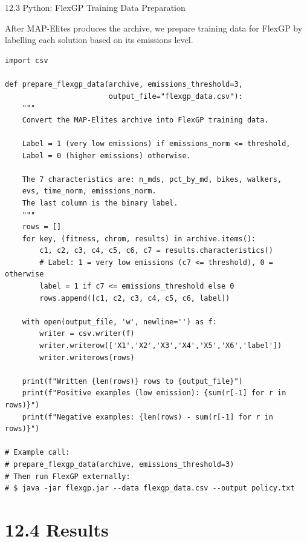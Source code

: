 \documentclass[aspectratio=169,10pt]{beamer}
\begin{document}
\begin{frame}[fragile]{12.3 Python: FlexGP Training Data Preparation}

After MAP-Elites produces the archive, we prepare training data
for FlexGP by labelling each solution based on its emissions level.

\begin{lstlisting}[caption={Prepare FlexGP training data from MAP-Elites archive}]
import csv

def prepare_flexgp_data(archive, emissions_threshold=3,
                        output_file="flexgp_data.csv"):
    """
    Convert the MAP-Elites archive into FlexGP training data.

    Label = 1 (very low emissions) if emissions_norm <= threshold,
    Label = 0 (higher emissions) otherwise.

    The 7 characteristics are: n_mds, pct_by_md, bikes, walkers,
    evs, time_norm, emissions_norm.
    The last column is the binary label.
    """
    rows = []
    for key, (fitness, chrom, results) in archive.items():
        c1, c2, c3, c4, c5, c6, c7 = results.characteristics()
        # Label: 1 = very low emissions (c7 <= threshold), 0 = otherwise
        label = 1 if c7 <= emissions_threshold else 0
        rows.append([c1, c2, c3, c4, c5, c6, label])

    with open(output_file, 'w', newline='') as f:
        writer = csv.writer(f)
        writer.writerow(['X1','X2','X3','X4','X5','X6','label'])
        writer.writerows(rows)

    print(f"Written {len(rows)} rows to {output_file}")
    print(f"Positive examples (low emission): {sum(r[-1] for r in rows)}")
    print(f"Negative examples: {len(rows) - sum(r[-1] for r in rows)}")

# Example call:
# prepare_flexgp_data(archive, emissions_threshold=3)
# Then run FlexGP externally:
# $ java -jar flexgp.jar --data flexgp_data.csv --output policy.txt
\end{lstlisting}

\end{frame}

\section{12.4 Results}
\end{document}
